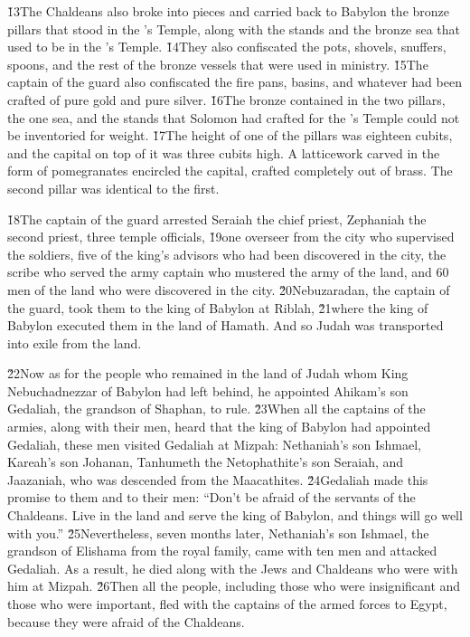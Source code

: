 \v{13}The Chaldeans also broke into pieces and carried back to Babylon the bronze pillars that stood in the 's Temple, along with the stands and the bronze sea that used to be in the 's Temple. \v{14}They also confiscated the pots, shovels, snuffers, spoons, and the rest of the bronze vessels that were used in ministry. \v{15}The captain of the guard also confiscated the fire pans, basins, and whatever had been crafted of pure gold and pure silver. \v{16}The bronze contained in the two pillars, the one sea, and the stands that Solomon had crafted for the 's Temple could not be inventoried for weight. \v{17}The height of one of the pillars was eighteen cubits, and the capital on top of it was three cubits high. A latticework carved in the form of pomegranates encircled the capital, crafted completely out of brass. The second pillar was identical to the first.

\v{18}The captain of the guard arrested Seraiah the chief priest, Zephaniah the second priest, three temple officials, \v{19}one overseer from the city who supervised the soldiers, five of the king's advisors who had been discovered in the city, the scribe who served the army captain who mustered the army of the land, and 60 men of the land who were discovered in the city. \v{20}Nebuzaradan, the captain of the guard, took them to the king of Babylon at Riblah, \v{21}where the king of Babylon executed them in the land of Hamath. And so Judah was transported into exile from the land.

\v{22}Now as for the people who remained in the land of Judah whom King Nebuchadnezzar of Babylon had left behind, he appointed Ahikam's son Gedaliah, the grandson of Shaphan, to rule. \v{23}When all the captains of the armies, along with their men, heard that the king of Babylon had appointed Gedaliah, these men visited Gedaliah at Mizpah: Nethaniah's son Ishmael, Kareah's son Johanan, Tanhumeth the Netophathite's son Seraiah, and Jaazaniah, who was descended from the Maacathites. \v{24}Gedaliah made this promise to them and to their men: ``Don't be afraid of the servants of the Chaldeans. Live in the land and serve the king of Babylon, and things will go well with you.'' \v{25}Nevertheless, seven months later, Nethaniah's son Ishmael, the grandson of Elishama from the royal family, came with ten men and attacked Gedaliah. As a result, he died along with the Jews and Chaldeans who were with him at Mizpah. \v{26}Then all the people, including those who were insignificant and those who were important, fled with the captains of the armed forces to Egypt, because they were afraid of the Chaldeans.


